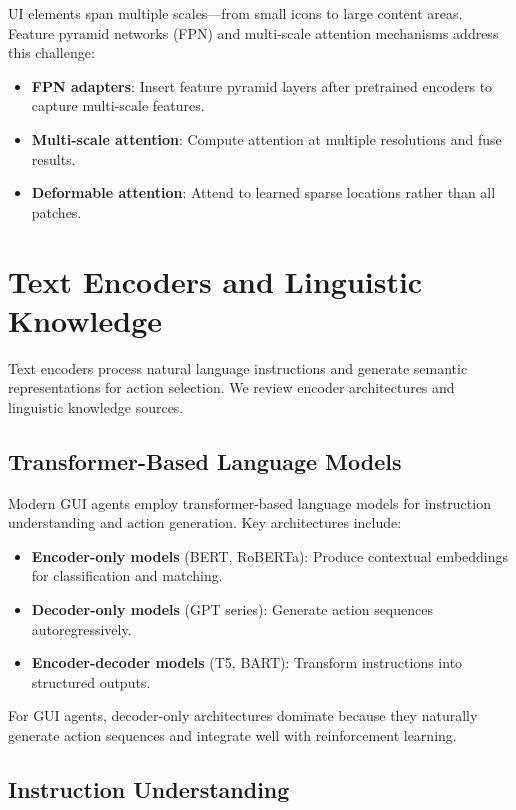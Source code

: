 \documentclass[11pt]{article}
\begin{document}
UI elements span multiple scales---from small icons to large content areas. Feature pyramid networks (FPN) and multi-scale attention mechanisms address this challenge:

\begin{itemize}
    \item \textbf{FPN adapters}: Insert feature pyramid layers after pretrained encoders to capture multi-scale features.
    \item \textbf{Multi-scale attention}: Compute attention at multiple resolutions and fuse results.
    \item \textbf{Deformable attention}: Attend to learned sparse locations rather than all patches.
\end{itemize}

\section{Text Encoders and Linguistic Knowledge}
\label{sec:text}

Text encoders process natural language instructions and generate semantic representations for action selection. We review encoder architectures and linguistic knowledge sources.

\subsection{Transformer-Based Language Models}

Modern GUI agents employ transformer-based language models for instruction understanding and action generation. Key architectures include:

\begin{itemize}
    \item \textbf{Encoder-only models} (BERT, RoBERTa): Produce contextual embeddings for classification and matching.
    \item \textbf{Decoder-only models} (GPT series): Generate action sequences autoregressively.
    \item \textbf{Encoder-decoder models} (T5, BART): Transform instructions into structured outputs.
\end{itemize}

For GUI agents, decoder-only architectures dominate because they naturally generate action sequences and integrate well with reinforcement learning.

\subsection{Instruction Understanding}
\end{document}

